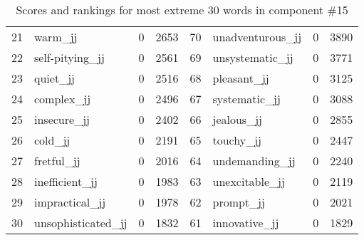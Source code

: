 \begin{table}[tbp]
\begin{tabular}{| rlr@{.}l | rlr@{.}l |}
    21 & warm\_jj & 0 & 2653    &    70 & unadventurous\_jj & 0 & 3890 \\
    22 & self-pitying\_jj & 0 & 2561    &    69 & unsystematic\_jj & 0 & 3771 \\
    23 & quiet\_jj & 0 & 2516    &    68 & pleasant\_jj & 0 & 3125 \\
    24 & complex\_jj & 0 & 2496    &    67 & systematic\_jj & 0 & 3088 \\
    25 & insecure\_jj & 0 & 2402    &    66 & jealous\_jj & 0 & 2855 \\
    26 & cold\_jj & 0 & 2191    &    65 & touchy\_jj & 0 & 2447 \\
    27 & fretful\_jj & 0 & 2016    &    64 & undemanding\_jj & 0 & 2240 \\
    28 & inefficient\_jj & 0 & 1983    &    63 & unexcitable\_jj & 0 & 2119 \\
    29 & impractical\_jj & 0 & 1978    &    62 & prompt\_jj & 0 & 2021 \\
    30 & unsophisticated\_jj & 0 & 1832    &    61 & innovative\_jj & 0 & 1829 \\
    \hline
    \end{tabular}
    \caption{Scores and rankings for most extreme 30 words in component \#15} 
\end{table}
\clearpage
